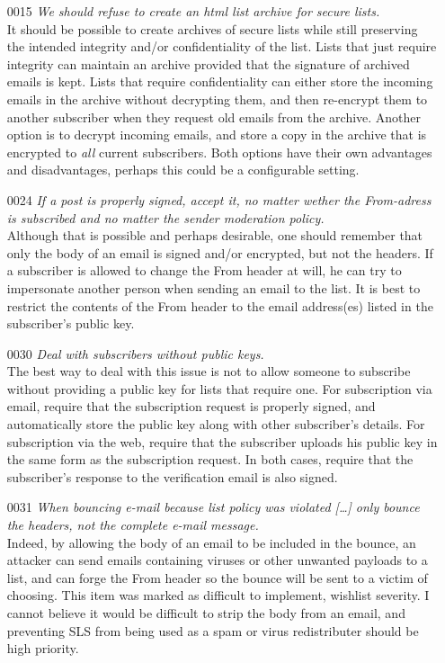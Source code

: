 \documentclass[a4]{article}
\begin{document}
\begin{enumerate}
\item[0015]\textit{We should refuse to create an html list archive for secure lists.}
\\
It should be possible to create archives of secure lists while still preserving the intended integrity and/or confidentiality of the list.
Lists that just require integrity can maintain an archive provided that the signature of archived emails is kept.
Lists that require confidentiality can either store the incoming emails in the archive without decrypting them, and then re-encrypt them to another subscriber when they request old emails from the archive.
Another option is to decrypt incoming emails, and store a copy in the archive that is encrypted to {\em all} current subscribers.
Both options have their own advantages and disadvantages, perhaps this could be a configurable setting.

\item[0024]\textit{If a post is properly signed, accept it, no matter wether the From-adress is subscribed and no matter the sender moderation policy.}
\\
Although that is possible and perhaps desirable,
one should remember that only the body of an email is signed and/or encrypted, but not the headers.
If a subscriber is allowed to change the From header at will,
he can try to impersonate another person when sending an email to the list.
It is best to restrict the contents of the From header to the email address(es) listed in the subscriber's public key.

\item[0030]\textit{Deal with subscribers without public keys.}
\\
The best way to deal with this issue is not to allow someone to subscribe without providing a public key for lists that require one.
For subscription via email, require that the subscription request is properly signed,
and automatically store the public key along with other subscriber's details.
For subscription via the web, require that the subscriber uploads his public key
in the same form as the subscription request.
In both cases, require that the subscriber's response to the verification email is also signed.

\item[0031]\textit{When bouncing e-mail because list policy was violated [\dots] only bounce the headers, not the complete e-mail message.}
\\
Indeed, by allowing the body of an email to be included in the bounce, an attacker can send emails containing viruses or other unwanted payloads to a list, and can forge the From header so the bounce will be sent to a victim of choosing.
This item was marked as difficult to implement, wishlist severity.
I cannot believe it would be difficult to strip the body from an email,
and preventing SLS from being used as a spam or virus redistributer should be high priority.


\end{enumerate}
\end{document}
